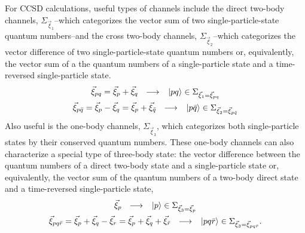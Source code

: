 \documentclass[thesis.tex]{subfiles}
\begin{document}
For CCSD calculations, useful types of channels include the direct two-body channels, $\Sigma_{\vec{\xi}_{1}}$--which categorizes the vector sum of two single-particle-state quantum numbers--and the cross two-body channels, $\Sigma_{\vec{\xi}_{2}}$--which categorizes the vector difference of two single-particle-state quantum numbers or, equivalently, the vector sum of a the quantum numbers of a single-particle state and a time-reversed single-particle state.
\begin{gather}
  \vec{\xi}_{pq} = \vec{\xi}_{p} + \vec{\xi}_{q}\ \ \longrightarrow\ \ \ket{pq} \in \Sigma_{\vec{\xi}_{1}=\vec{\xi}_{pq}} \\
  \vec{\xi}_{p\bar{q}} = \vec{\xi}_{p} - \vec{\xi}_{q} = \vec{\xi}_{p} + \vec{\xi}_{\bar{q}}\ \ \longrightarrow\ \ \ket{p\bar{q}} \in \Sigma_{\vec{\xi}_{2}=\vec{\xi}_{p\bar{q}}}
\end{gather}
Also useful is the one-body channels, $\Sigma_{\vec{\xi}_{3}}$, which categorizes both single-particle states by their conserved quantum numbers.  These one-body channels can also characterize a special type of three-body state: the vector difference between the quantum numbers of a direct two-body state and a single-particle state or, equivalently, the vector sum of the quantum numbers of a two-body direct state and a time-reversed single-particle state,
\begin{gather}
  \vec{\xi}_{p}\ \ \longrightarrow\ \ \ket{p} \in \Sigma_{\vec{\xi}_{3}=\vec{\xi}_{p}} \\
  \vec{\xi}_{pq\bar{r}} = \vec{\xi}_{p} + \vec{\xi}_{q} - \vec{\xi}_{r} = \vec{\xi}_{p} + \vec{\xi}_{q} + \vec{\xi}_{\bar{r}}\ \ \longrightarrow\ \ \ket{pq\bar{r}} \in \Sigma_{\vec{\xi}_{3}=\vec{\xi}_{pq\bar{r}}}.
\end{gather}
\end{document}
